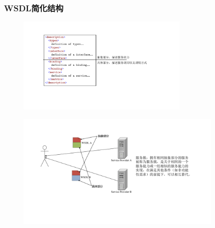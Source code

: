 \subsubsection{WSDL简化结构}
\begin{figure}[H]
    \vspace{-0.7em}
	\centering
	\includegraphics[width=0.75\textwidth]{images/WSDL简化结构.pdf}
    \vspace{-1em}
\end{figure}

\begin{figure}[H]
    \vspace{-0.7em}
	\centering
	\includegraphics[width=0.9\textwidth]{images/服务簇.pdf}
    \vspace{-1em}
\end{figure}

